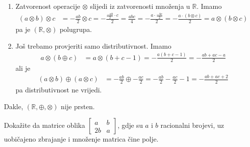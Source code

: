 \documentclass{exam}
\begin{document}
\begin{questions}
\begin{solution}
\begin{enumerate}
    \item Zatvorenost operacije $\otimes$ slijedi iz zatvorenosti množenja u $\mathbb{R}$. Imamo
      \begin{align*}
        (a \otimes b) \otimes c &= -\frac{ab}{2} \otimes c = -\frac{\frac{-ab}{2} \cdot c}{2} = \frac{abc}{4} = -\frac{a \cdot \frac{-bc}{2}}{2} = -\frac{a \cdot (b \otimes c)}{2} = a \otimes (b \otimes c)
      \end{align*}
      pa je $(\mathbb{R}, \otimes)$ polugrupa.

    \item Još trebamo provjeriti samo distributivnost. Imamo
      \begin{align*}
        a \otimes (b \oplus c) &= a \otimes (b + c - 1) = -\frac{a(b + c - 1)}{2} = -\frac{ab + ac - a}{2}
      \end{align*}
      ali je
      \begin{align*}
        (a \otimes b) \oplus (a \otimes c) &= -\frac{ab}{2} \oplus -\frac{ac}{2} = -\frac{ab}{2} - \frac{ac}{2} - 1 = -\frac{ab + ac + 2}{2}
      \end{align*}
      pa distributivnost ne vrijedi.
  \end{enumerate}
  Dakle, $(\mathbb{R}, \oplus, \otimes)$ nije prsten.
\end{solution}

\pagebreak

\question Dokažite da matrice oblika $
\begin{bmatrix}
  a & b \\
  2b & a
\end{bmatrix}$, gdje su $a$ i $b$ racionalni brojevi, uz uobičajeno zbrajanje i množenje matrica čine polje.


\end{questions}
\end{document}
